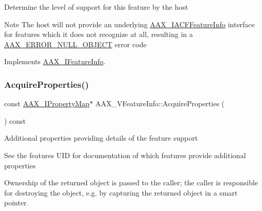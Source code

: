 Determine the level of support for this feature by the host

\begin{DoxyNote}{Note}
The host will not provide an underlying \mbox{\hyperlink{a01689}{A\+A\+X\+\_\+\+I\+A\+C\+F\+Feature\+Info}} interface for features which it does not recognize at all, resulting in a \mbox{\hyperlink{a00494_a5f8c7439f3a706c4f8315a9609811937a647cce13fa531e3a46c6eab694048a9c}{A\+A\+X\+\_\+\+E\+R\+R\+O\+R\+\_\+\+N\+U\+L\+L\+\_\+\+O\+B\+J\+E\+CT}} error code 
\end{DoxyNote}


Implements \mbox{\hyperlink{a01829_a5f105b85ef855eb8c3da0ff06325b018}{A\+A\+X\+\_\+\+I\+Feature\+Info}}.

\mbox{\label{a01917_a021eb7c27054e8ee67dbc0f8d314960c}} 
\subsubsection{\texorpdfstring{AcquireProperties()}{AcquireProperties()}}
{\footnotesize\ttfamily const \mbox{\hyperlink{a01869}{A\+A\+X\+\_\+\+I\+Property\+Map}}$\ast$ A\+A\+X\+\_\+\+V\+Feature\+Info\+::\+Acquire\+Properties (\begin{DoxyParamCaption}{ }\end{DoxyParamCaption}) const\hspace{0.3cm}{\ttfamily [virtual]}}





Additional properties providing details of the feature support

See the feature\textquotesingle{}s U\+ID for documentation of which features provide additional properties

Ownership of the returned object is passed to the caller; the caller is responsible for destroying the object, e.\+g. by capturing the returned object in a smart pointer.


\begin{DoxyCode}{0}
\DoxyCodeLine{\textcolor{comment}{// AAX\_IFeatureInfo* featureInfo}}
\end{DoxyCode}


